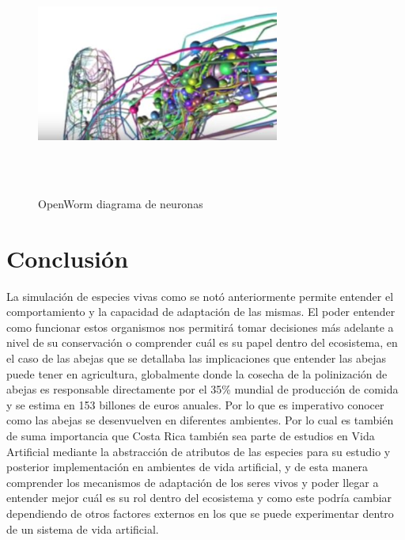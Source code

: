 \documentclass[conference]{IEEEtran}
\begin{document}
\begin{figure}[ht]
  \includegraphics[width=8cm,height=8cm]{img/openworm.jpg}
  \caption{ OpenWorm diagrama de neuronas \cite{openworm}}
  \label{fig:openworm}
\end{figure}

\section{Conclusi\'on}

La simulaci\'on de especies vivas como se not\'o anteriormente permite entender el comportamiento y la capacidad de adaptaci\'on de las mismas. El poder entender como funcionar estos organismos nos permitir\'a tomar decisiones m\'as adelante a nivel de su conservaci\'on o comprender cu\'al es su papel dentro del ecosistema, en el caso de las abejas que se detallaba las implicaciones que entender las abejas puede tener en agricultura, globalmente donde la cosecha de la polinizaci\'on de abejas es responsable directamente por el 35\% mundial de producci\'on de comida y se estima en 153 billones de euros anuales. Por lo que es imperativo conocer como las abejas se desenvuelven en diferentes ambientes.\cite{ZOE01} 
Por lo cual es tambi\'en de suma importancia que Costa Rica tambi\'en sea parte de estudios en Vida Artificial mediante la abstracci\'on de atributos de las especies para su estudio y posterior implementaci\'on en ambientes de vida artificial, y de esta manera comprender los mecanismos de adaptaci\'on de los seres vivos y poder llegar a entender mejor cu\'al es su rol dentro del ecosistema y como este podr\'ia cambiar dependiendo de otros factores externos en los que se puede experimentar dentro de un sistema de vida artificial.

\nocite{*}


\end{document}
